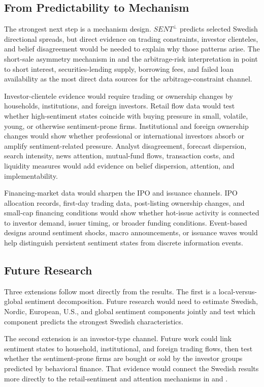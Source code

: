 \documentclass[11pt]{article}
\newcommand{\var}[1]{\ensuremath{#1}}
\begin{document}
\subsection{From Predictability to Mechanism}
The strongest next step is a mechanism design. \var{SENT^{\perp}} predicts selected Swedish directional spreads, but direct evidence on trading constraints, investor clienteles, and belief disagreement would be needed to explain why those patterns arise. The short-sale asymmetry mechanism in \citet{stambaugh2012short} and the arbitrage-risk interpretation in \citet{stambaugh2015ivol} point to short interest, securities-lending supply, borrowing fees, and failed loan availability as the most direct data sources for the arbitrage-constraint channel.

Investor-clientele evidence would require trading or ownership changes by households, institutions, and foreign investors. Retail flow data would test whether high-sentiment states coincide with buying pressure in small, volatile, young, or otherwise sentiment-prone firms. Institutional and foreign ownership changes would show whether professional or international investors absorb or amplify sentiment-related pressure. Analyst disagreement, forecast dispersion, search intensity, news attention, mutual-fund flows, transaction costs, and liquidity measures would add evidence on belief dispersion, attention, and implementability.

Financing-market data would sharpen the IPO and issuance channels. IPO allocation records, first-day trading data, post-listing ownership changes, and small-cap financing conditions would show whether hot-issue activity is connected to investor demand, issuer timing, or broader funding conditions. Event-based designs around sentiment shocks, macro announcements, or issuance waves would help distinguish persistent sentiment states from discrete information events.

\subsection{Future Research}
Three extensions follow most directly from the results. The first is a local-versus-global sentiment decomposition. Future research would need to estimate Swedish, Nordic, European, U.S., and global sentiment components jointly and test which component predicts the strongest Swedish characteristics.

The second extension is an investor-type channel. Future work could link sentiment states to household, institutional, and foreign trading flows, then test whether the sentiment-prone firms are bought or sold by the investor groups predicted by behavioral finance. That evidence would connect the Swedish results more directly to the retail-sentiment and attention mechanisms in \citet{kumar2006retail} and \citet{barber2008glitters}.
\end{document}
